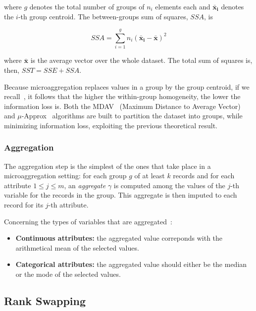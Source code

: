 where $g$ denotes the total number of groups of $n_i$ elements each and $\mathbf{\bar{x}_i}$ denotes the $i$-th group centroid. The between-groups sum of squares, $SSA$, is

\begin{equation}
SSA = \sum_{i=1}^{g} n_i (\mathbf{\bar{x}_i} - \mathbf{\bar{x}})^2
\end{equation}

where $\mathbf{\bar{x}}$ is the average vector over the whole dataset. The total sum of squares is, then, $SST = SSE + SSA$.

Because microaggregation replaces values in a group by the group centroid, if we recall~, it follows that the higher the within-group homogeneity, the lower the information loss is. Both the MDAV~\citep{Domingo:KAnonMicroagg} (Maximum Distance to Average Vector) and $\mu$-Approx~\citep{Domingo:MuAproxPolyTimeMicroagg} algorithms are built to partition the dataset into groups, while minimizing information loss, exploiting the previous theoretical result.

\subsubsection{Aggregation}

The aggregation step is the simplest of the ones that take place in a microaggregation setting: for each group $g$ of at least $k$ records and for each attribute $1 \leq j \leq m$, an \textit{aggregate} $\gamma$ is computed among the values of the $j$-th variable for the records in the group. This aggregate is then imputed to each record for its $j$-th attribute.

Concerning the types of variables that are aggregated~\citep{Domingo:KAnonMicroagg}:

\begin{itemize}
	\item
	\textbf{Continuous attributes:} the aggregated value correponds with the arithmetical mean of the selected values.
	\item
	\textbf{Categorical attributes:} the aggregated value should either be the median or the mode of the selected values.
\end{itemize}

\subsection{Rank Swapping}
\label{Theory:SDCMethods:RankSwapping}

